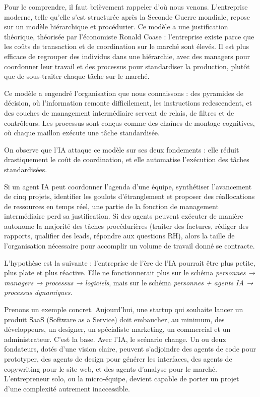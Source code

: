 Pour le comprendre, il faut brièvement rappeler d'où nous venons. L'entreprise moderne, telle qu'elle s'est structurée après la Seconde Guerre mondiale, repose sur un modèle hiérarchique et procédurier. Ce modèle a une justification théorique, théorisée par l'économiste Ronald Coase : l'entreprise existe parce que les coûts de transaction et de coordination sur le marché sont élevés. Il est plus efficace de regrouper des individus dans une hiérarchie, avec des managers pour coordonner leur travail et des processus pour standardiser la production, plutôt que de sous-traiter chaque tâche sur le marché.

Ce modèle a engendré l'organisation que nous connaissons : des pyramides de décision, où l'information remonte difficilement, les instructions redescendent, et des couches de management intermédiaire servent de relais, de filtres et de contrôleurs. Les processus sont conçus comme des chaînes de montage cognitives, où chaque maillon exécute une tâche standardisée.

On observe que l'IA attaque ce modèle sur ses deux fondements : elle réduit drastiquement le coût de coordination, et elle automatise l'exécution des tâches standardisées.

Si un agent IA peut coordonner l'agenda d'une équipe, synthétiser l'avancement de cinq projets, identifier les goulots d'étranglement et proposer des réallocations de ressources en temps réel, une partie de la fonction de management intermédiaire perd sa justification. Si des agents peuvent exécuter de manière autonome la majorité des tâches procédurières (traiter des factures, rédiger des rapports, qualifier des leads, répondre aux questions RH), alors la taille de l'organisation nécessaire pour accomplir un volume de travail donné se contracte.

L'hypothèse est la suivante : l'entreprise de l'ère de l'IA pourrait être plus petite, plus plate et plus réactive. Elle ne fonctionnerait plus sur le schéma \emph{personnes → managers → processus → logiciels}, mais sur le schéma \emph{personnes + agents IA → processus dynamiques}.

Prenons un exemple concret. Aujourd'hui, une startup qui souhaite lancer un produit SaaS (Software as a Service) doit embaucher, au minimum, des développeurs, un designer, un spécialiste marketing, un commercial et un administrateur. C'est la base. Avec l'IA, le scénario change. Un ou deux fondateurs, dotés d'une vision claire, peuvent s'adjoindre des agents de code pour prototyper, des agents de design pour générer les interfaces, des agents de copywriting pour le site web, et des agents d'analyse pour le marché. L'entrepreneur solo, ou la micro-équipe, devient capable de porter un projet d'une complexité autrement inaccessible.

